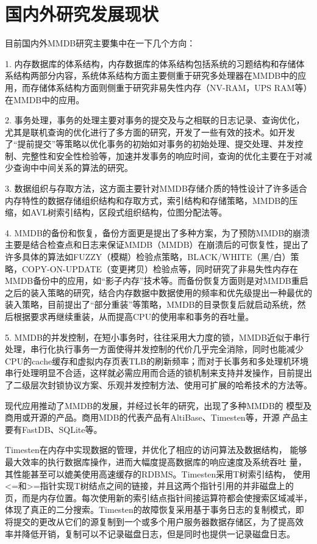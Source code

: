 \documentclass[proposal]{zjutreport}
\begin{document}
\section{国内外研究发展现状}
目前国内外MMDB研究主要集中在一下几个方向：

1. 内存数据库的体系结构，内存数据库的体系结构包括系统的习题结构和存储体系结构两部分内容，系统体系结构方面主要侧重于研究多处理器在MMDB中的应用，而存储体系结构方面则侧重于研究非易失性内存（NV-RAM，UPS RAM等）在MMDB中的应用。

2. 事务处理，事务的处理主要对事务的提交及与之相联的日志记录、查询优化，尤其是联机查询的优化进行了多方面的研究，开发了一些有效的技术。如开发了“提前提交”等策略以优化事务的初始如对事务的初始处理、提交处理、并发控制、完整性和安全性检验等，加速并发事务的响应时间，查询的优化主要在于对减少查询中中间关系的算法的研究。

3. 数据组织与存取方法，这方面主要针对MMDB存储介质的特性设计了许多适合内存特性的数据存储组织结构和存取方式，索引结构和存储策略，MMDB的压缩，如AVL树索引结构，区段式组织结构，位图分配法等。

4. MMDB的备份和恢复，备份方面更是提出了多种方案，为了预防MMDB的崩溃主要是结合检查点和日志来保证MMDB（MMDB）在崩溃后的可恢复性，提出了许多具体的算法如FUZZY（模糊）检验点策略，BLACK/WHITE（黑/白）策略，COPY-ON-UPDATE（变更拷贝）检验点等，同时研究了非易失性内存在MMDB备份中的应用，如“影子内存”技术等。而备份恢复方面则是对MMDB重启之后的装入策略的研究，结合内存数据中数据使用的频率和优先级提出一种最优的装入策略，目前提出了“部分重装”等策略，MMDB的目录恢复后就启动系统，然后根据要求再继续重装，从而提高CPU的使用率和事务的吞吐量。

5. MMDB的并发控制，在短小事务时，往往采用大力度的锁，MMDB近似于串行处理，串行化执行事务一方面使得并发控制的代价几乎完全消除，同时也能减少CPU的cache缓存和虚拟内存页表TLB的刷新频率；而对于长事务和多处理机环境串行处理明显不合适，这样就必需应用而合适的锁机制来支持并发操作，目前提出了二级层次封锁协议方案、乐观并发控制方法、使用可扩展的哈希技术的方法等。

现代应用推动了MMDB的发展，并经过长年的研究，出现了多种MMDB的
模型及商用或开源的产品。商用MDB的代表产品有AltiBase、Timesten等，开源
产品主要有FastDB、SQLite等。

Timesten在内存中实现数据的管理，并优化了相应的访问算法及数据结构，
能够最大效率的执行数据库操作，进而大幅度提高数据库的响应速度及系统吞吐
量，其性能甚至可以媲美使用高速缓存的RDBMS。Timesten采用T树索引结构，
使用<=和>=指针实现T树结点之间的链接，并且这两个指针引用的并非磁盘上的
页，而是内存位置。每次使用新的索引结点指针间接运算符都会使搜索区域减半，
体现了真正的二分搜索。Timesten的故障恢复采用基于事务日志的复制模式，即
将提交的更改从它们的源复制到一个或多个用户服务器数据存储区，为了提高效
率并降低开销，复制可以不记录磁盘日志，但是同时也提供一记录磁盘日志。
\end{document}
